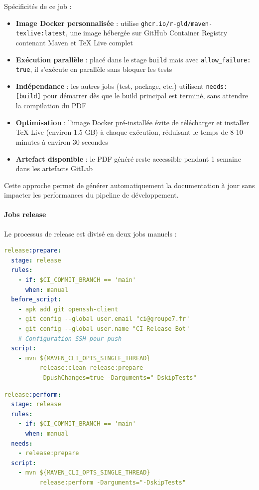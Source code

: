 Spécificités de ce job :
\begin{itemize}
    \item \textbf{Image Docker personnalisée} : utilise \texttt{ghcr.io/r-gld/maven-texlive:latest}, une image hébergée sur GitHub Container Registry contenant Maven et TeX Live complet
    \item \textbf{Exécution parallèle} : placé dans le stage \texttt{build} mais avec \texttt{allow\_failure: true}, il s'exécute en parallèle sans bloquer les tests
    \item \textbf{Indépendance} : les autres jobs (test, package, etc.) utilisent \texttt{needs: [build]} pour démarrer dès que le build principal est terminé, sans attendre la compilation du PDF
    \item \textbf{Optimisation} : l'image Docker pré-installée évite de télécharger et installer TeX Live (environ 1.5 GB) à chaque exécution, réduisant le temps de 8-10 minutes à environ 30 secondes
    \item \textbf{Artefact disponible} : le PDF généré reste accessible pendant 1 semaine dans les artefacts GitLab
\end{itemize}

Cette approche permet de générer automatiquement la documentation à jour sans impacter les performances du pipeline de développement.

\paragraph{Jobs release}

Le processus de release est divisé en deux jobs manuels :

\begin{lstlisting}[language=yaml, caption=Release prepare]
release:prepare:
  stage: release
  rules:
    - if: $CI_COMMIT_BRANCH == 'main'
      when: manual
  before_script:
    - apk add git openssh-client
    - git config --global user.email "ci@groupe7.fr"
    - git config --global user.name "CI Release Bot"
    # Configuration SSH pour push
  script:
    - mvn ${MAVEN_CLI_OPTS_SINGLE_THREAD}
          release:clean release:prepare
          -DpushChanges=true -Darguments="-DskipTests"
\end{lstlisting}

\begin{lstlisting}[language=yaml, caption=Release perform]
release:perform:
  stage: release
  rules:
    - if: $CI_COMMIT_BRANCH == 'main'
      when: manual
  needs:
    - release:prepare
  script:
    - mvn ${MAVEN_CLI_OPTS_SINGLE_THREAD}
          release:perform -Darguments="-DskipTests"
\end{lstlisting}

